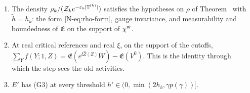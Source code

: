 \begin{detail}\label{xb:d-genstep}
\begin{enumerate}[label=(\alph*)]
\item The density $\rho_k/(\mathcal Z_ke^{-\varepsilon_k|\mathbb T^{(k)}|})$ satisfies the hypotheses on $\rho$ of Theorem~ with $\tilde h=h_k$: the form \eqref{N-eq:rho-form}, gauge invariance, and measurability and boundedness of $\mathfrak E$ on the support of $\chi^{\rm w}$.
\item At real critical references and real $\xi$, on the support of the cutoffs, $\sum_Yf(Y;1,Z)=\mathfrak E(e^{\ii\hat Z(Z)}W)-\mathfrak E(V^0)$. This is the identity through which the step sees the old activities.
\item $E'$ has (G3) at every threshold $h'\in(0,\min(2h_k,\gamma p(\gamma))]$.
\end{enumerate}
\end{detail}

